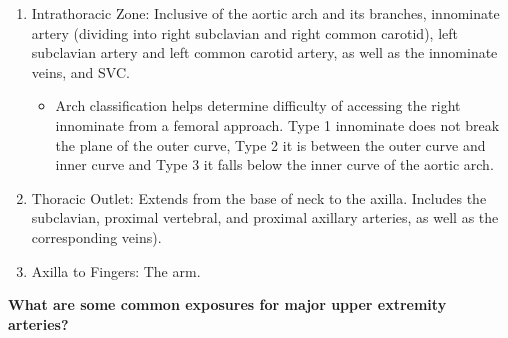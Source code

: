 \documentclass[
]{book}
\providecommand{\tightlist}{%
  \setlength{\itemsep}{0pt}\setlength{\parskip}{0pt}}
\begin{document}
\begin{enumerate}
\def\labelenumi{\arabic{enumi}.}
\item
  Intrathoracic Zone: Inclusive of the aortic arch and its branches,
  innominate artery (dividing into right subclavian and right common
  carotid), left subclavian artery and left common carotid artery, as
  well as the innominate veins, and SVC.

  \begin{itemize}
  \tightlist
  \item
    Arch classification helps determine difficulty of accessing the
    right innominate from a femoral approach. Type 1 innominate does
    not break the plane of the outer curve, Type 2 it is between the
    outer curve and inner curve and Type 3 it falls below the inner
    curve of the aortic arch.
  \end{itemize}
\item
  Thoracic Outlet: Extends from the base of neck to the axilla.
  Includes the subclavian, proximal vertebral, and proximal axillary
  arteries, as well as the corresponding veins).
\item
  Axilla to Fingers: The arm.
\end{enumerate}

\textbf{What are some common exposures for major upper extremity
arteries?}\citep{illig57UpperExtremity2019, garygwindAnatomicExposuresVascular2013}
\end{document}
